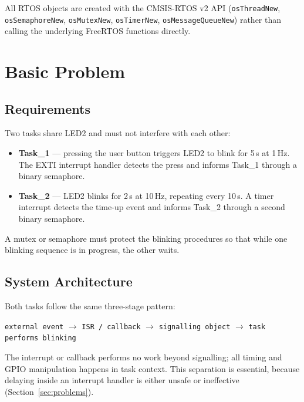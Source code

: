 \documentclass[11pt,a4paper]{article}
\begin{document}
All RTOS objects are created with the CMSIS-RTOS v2 API
(\texttt{osThreadNew}, \texttt{osSemaphoreNew}, \texttt{osMutexNew},
\texttt{osTimerNew}, \texttt{osMessageQueueNew}) rather than calling the
underlying FreeRTOS functions directly.

\section{Basic Problem}

\subsection{Requirements}

Two tasks share LED2 and must not interfere with each other:

\begin{itemize}
  \item \textbf{Task\_1} --- pressing the user button triggers LED2 to blink for
        5\,s at 1\,Hz. The EXTI interrupt handler detects the press and informs
        Task\_1 through a binary semaphore.
  \item \textbf{Task\_2} --- LED2 blinks for 2\,s at 10\,Hz, repeating every
        10\,s. A timer interrupt detects the time-up event and informs Task\_2
        through a second binary semaphore.
\end{itemize}

A mutex or semaphore must protect the blinking procedures so that while one
blinking sequence is in progress, the other waits.

\subsection{System Architecture}

Both tasks follow the same three-stage pattern:

\begin{center}
\texttt{external event} $\rightarrow$ \texttt{ISR / callback} $\rightarrow$
\texttt{signalling object} $\rightarrow$ \texttt{task performs blinking}
\end{center}

The interrupt or callback performs no work beyond signalling; all timing and
GPIO manipulation happens in task context. This separation is essential,
because delaying inside an interrupt handler is either unsafe or ineffective
(Section~\ref{sec:problems}).
\end{document}
